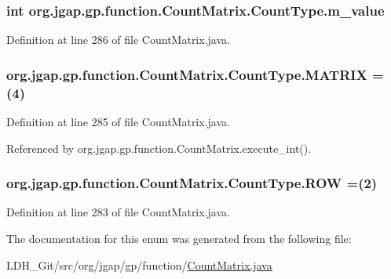 \hypertarget{enumorg_1_1jgap_1_1gp_1_1function_1_1_count_matrix_1_1_count_type_a64b4c38ac118af50023dbeee1ae8c562}{
\subsubsection[{m\-\_\-value}]{\setlength{\rightskip}{0pt plus 5cm}int org.\-jgap.\-gp.\-function.\-Count\-Matrix.\-Count\-Type.\-m\-\_\-value\hspace{0.3cm}{\ttfamily [private]}}}\label{enumorg_1_1jgap_1_1gp_1_1function_1_1_count_matrix_1_1_count_type_a64b4c38ac118af50023dbeee1ae8c562}


Definition at line 286 of file Count\-Matrix.\-java.

\hypertarget{enumorg_1_1jgap_1_1gp_1_1function_1_1_count_matrix_1_1_count_type_ab0c9b4428d0cad392e0f1216b757c0ac}{
\subsubsection[{M\-A\-T\-R\-I\-X}]{\setlength{\rightskip}{0pt plus 5cm}org.\-jgap.\-gp.\-function.\-Count\-Matrix.\-Count\-Type.\-M\-A\-T\-R\-I\-X =(4)}}\label{enumorg_1_1jgap_1_1gp_1_1function_1_1_count_matrix_1_1_count_type_ab0c9b4428d0cad392e0f1216b757c0ac}


Definition at line 285 of file Count\-Matrix.\-java.



Referenced by org.\-jgap.\-gp.\-function.\-Count\-Matrix.\-execute\-\_\-int().

\hypertarget{enumorg_1_1jgap_1_1gp_1_1function_1_1_count_matrix_1_1_count_type_a45fcb697f06e665534259c110f2c32ec}{
\subsubsection[{R\-O\-W}]{\setlength{\rightskip}{0pt plus 5cm}org.\-jgap.\-gp.\-function.\-Count\-Matrix.\-Count\-Type.\-R\-O\-W =(2)}}\label{enumorg_1_1jgap_1_1gp_1_1function_1_1_count_matrix_1_1_count_type_a45fcb697f06e665534259c110f2c32ec}


Definition at line 283 of file Count\-Matrix.\-java.



The documentation for this enum was generated from the following file\-:\begin{DoxyCompactItemize}
\item 
L\-D\-H\-\_\-\-Git/src/org/jgap/gp/function/\hyperlink{_count_matrix_8java}{Count\-Matrix.\-java}\end{DoxyCompactItemize}
